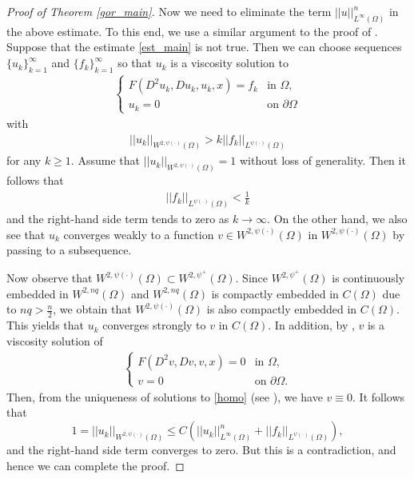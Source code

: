 \documentclass[11pt, reqno]{amsart}
\numberwithin{equation}{section}
\begin{document}
\begin{proof}[Proof of Theorem \ref{gor_main}]
Now we need to eliminate the term $||u||_{ L^{\infty}(\Omega)}^n $ in the above estimate.
To this end, we use a similar argument to the proof of \cite[Theorem 2.6]{MR3390010}.
Suppose that the estimate \eqref{est_main} is not true.
Then we can choose sequences $\{u_k\}_{k=1}^{\infty}$ and $\{f_k\}_{k=1}^{\infty}$ so that
$u_k$ is a viscosity solution to
\begin{align*} 
\left\{ \begin{array}{ll}
F(D^{2}u_k,Du_k,u_k,x) = f_k & \textrm{in $\Omega, $}\\
u_k=0 & \textrm{on $\partial \Omega$}
\end{array} \right.
\end{align*}
with
\begin{align}\label{adco1}
    ||u_k||_{ W^{2, \psi(\cdot)}(\Omega)} > k||f_k||_{ L^{ \psi(\cdot)}(\Omega)} 
\end{align}
for any $k\ge1$.
Assume that $||u_k||_{ W^{2, \psi(\cdot)}(\Omega)}=1 $ without loss of generality.
Then it follows that
\begin{align}\label{adco2}
  ||f_k||_{ L^{ \psi(\cdot)}(\Omega)} <   \frac{1}{k}
\end{align}
and the right-hand side term tends to zero as $k\to\infty$.
On the other hand, we also see that $u_k$ converges weakly to a function $v\in  W^{2, \psi(\cdot)}(\Omega)$ in $W^{2, \psi(\cdot)}(\Omega) $ by passing to a subsequence.

Now observe that $W^{2, \psi(\cdot)}(\Omega)\subset W^{2, \psi^+}(\Omega) $.
Since $  W^{2, \psi^+}(\Omega)$ is continuously embedded in $W^{2,nq}(\Omega)$ and 
$W^{2,nq}(\Omega) $ is compactly embedded in $C(\Omega)$ due to $nq>\frac{n}{2}$,
we obtain that  $W^{2, \psi(\cdot)}(\Omega) $ is also compactly embedded in $C(\Omega)$.
This yields that $u_k$ converges strongly to $v$ in $C(\Omega)$.
In addition, by \cite[Proposition 1.5]{MR2486925}, $v$ is a viscosity solution of
\begin{align}\label{homo}
\left\{ \begin{array}{ll}
F(D^{2}v,Dv,v,x) = 0 & \textrm{in $\Omega, $}\\
v=0 & \textrm{on $\partial \Omega.$}
\end{array} \right.
\end{align}
Then, from the uniqueness of solutions to \eqref{homo} (see \cite[Theorem 2.10]{MR1376656}), we have $v\equiv 0$.
It follows that
$$1= ||u_k||_{ W^{2, \psi(\cdot)}(\Omega)}\le C(||u_k||_{ L^{\infty}(\Omega)}^n+||f_k||_{ L^{\psi(\cdot)}(\Omega)}),$$
and the right-hand side term converges to zero.
But this is a contradiction, and hence we can complete the proof.
\end{proof}
\end{document}
